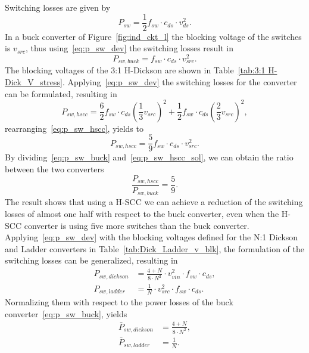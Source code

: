 Switching losses are given by~\cite{2001Erickson}
\begin{equation}
P_{sw} = \frac{1}{2} f_{sw} \cdot c_{ds} \cdot v_{ds}^2.
\label{eq:p_sw_dev}
\end{equation}
In a buck converter of Figure~\ref{fig:ind_ckt_l} the blocking voltage of the switches is $v_{src}$, thus using~\eqref{eq:p_sw_dev} the switching losses result in
\begin{equation}
P_{sw,buck} =   f_{sw} \cdot c_{ds} \cdot v_{src}^2.
\label{eq:p_sw_buck}
\end{equation}
The blocking voltages of the 3:1 H-Dickson are shown in Table~\ref{tab:3:1 H-Dick_V_stress}.  Applying~\eqref{eq:p_sw_dev} the switching losses for the converter can be formulated, resulting in
\begin{equation}
P_{sw,hscc} =  \frac{6}{2}  f_{sw} \cdot c_{ds} \left( \frac{1}{3} v_{src} \right)^2 + \frac{1}{2}  f_{sw} \cdot c_{ds} \left( \frac{2}{3} v_{src} \right)^2 ,
\label{eq:p_sw_hscc}
\end{equation}
rearranging~\eqref{eq:p_sw_hscc},  yields to
\begin{equation}
P_{sw,hscc} =  \frac{5}{9}  f_{sw} \cdot c_{ds} \cdot v_{src}^2.
\label{eq:p_sw_hscc_sol}
\end{equation}
By dividing~\eqref{eq:p_sw_buck} and~\eqref{eq:p_sw_hscc_sol}, we can obtain  the ratio between the two converters
\begin{equation}
\frac{P_{sw,hscc}}{P_{sw,buck}} =  \frac{5}{9}.
\label{eq:p_sw_rel}
\end{equation}
The result shows that using a H-SCC we can achieve a reduction of the switching losses of almost one half with respect to the buck converter, even when the H-SCC converter is using five more switches than the buck converter. Applying~\eqref{eq:p_sw_dev} with the blocking voltages defined for the N:1 Dickson and Ladder converters in Table~\ref{tab:Dick_Ladder_v_blk}, the formulation of the switching losses can be generalized, resulting in
\begin{align}
P_{sw,dickson} & =  \frac{4+N}{8 \cdot N^2} \cdot v_{vin}^2 \cdot f_{sw}  \cdot {c_{ds}} , \\
P_{sw,ladder}  & =  \frac{1}{ N} \cdot v_{src}^2 \cdot f_{sw} \cdot {c_{ds}}    .
\label{eq:p_sw_gen}
\end{align}
Normalizing them with respect to the power losses of the buck converter~\eqref{eq:p_sw_buck}, yields
\begin{align}
\bar{P}_{sw,dickson} & = \frac{4+N}{8 \cdot N^2} ,\label{eq:n_sw_dick}\\
\bar{P}_{sw,ladder} & = \frac{1}{ N}. \label{eq:n_sw_lddr}
\end{align}
